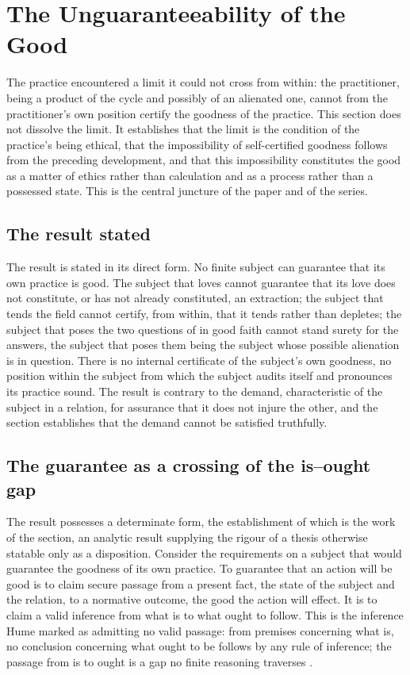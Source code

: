 \section{The Unguaranteeability of the Good}
\label{p10:sec:keystone}

\noindent
The practice encountered a limit it could not cross from within: the practitioner, being a product of the cycle and possibly of an alienated one, cannot from the practitioner's own position certify the goodness of the practice. This section does not dissolve the limit. It establishes that the limit is the condition of the practice's being ethical, that the impossibility of self-certified goodness follows from the preceding development, and that this impossibility constitutes the good as a matter of ethics rather than calculation and as a process rather than a possessed state. This is the central juncture of the paper and of the series.

\subsection{The result stated}
\label{p10:sec:cruelty}

The result is stated in its direct form. No finite subject can guarantee that its own practice is good. The subject that loves cannot guarantee that its love does not constitute, or has not already constituted, an extraction; the subject that tends the field cannot certify, from within, that it tends rather than depletes; the subject that poses the two questions of  in good faith cannot stand surety for the answers, the subject that poses them being the subject whose possible alienation is in question. There is no internal certificate of the subject's own goodness, no position within the subject from which the subject audits itself and pronounces its practice sound. The result is contrary to the demand, characteristic of the subject in a relation, for assurance that it does not injure the other, and the section establishes that the demand cannot be satisfied truthfully.

\subsection{The guarantee as a crossing of the is--ought gap}
\label{p10:sec:hume}

The result possesses a determinate form, the establishment of which is the work of the section, an analytic result supplying the rigour of a thesis otherwise statable only as a disposition. Consider the requirements on a subject that would guarantee the goodness of its own practice. To guarantee that an action will be good is to claim secure passage from a present fact, the state of the subject and the relation, to a normative outcome, the good the action will effect. It is to claim a valid inference from what is to what ought to follow. This is the inference Hume marked as admitting no valid passage: from premises concerning what is, no conclusion concerning what ought to be follows by any rule of inference; the passage from is to ought is a gap no finite reasoning traverses \parencite{hume2000}.

